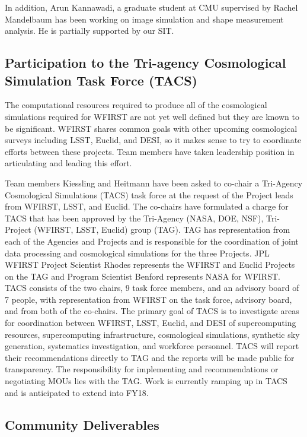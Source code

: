 In addition, Arun Kannawadi, a graduate student at CMU supervised by Rachel Mandelbaum has been working on image simulation and shape measurement analysis. He is partially supported by our SIT.

\subsection{Participation to the Tri-agency  Cosmological Simulation Task Force (TACS)}

The computational resources required to produce all of the cosmological simulations required for WFIRST are not yet well defined but they are known to be significant. WFIRST shares common goals with other upcoming cosmological surveys including LSST, Euclid, and DESI, so it makes sense to try to coordinate efforts between these projects. Team members have taken leadership position in articulating and leading this effort.

Team members Kiessling and Heitmann have been asked to co-chair a Tri-Agency Cosmological Simulations (TACS) task force at the request of the Project leads from WFIRST, LSST, and Euclid. The co-chairs have formulated a charge for TACS that has been approved by the Tri-Agency (NASA, DOE, NSF), Tri-Project (WFIRST, LSST, Euclid) group (TAG). TAG has representation from each of the Agencies and Projects and is responsible for the coordination of joint data processing and cosmological simulations for the three Projects. JPL WFIRST Project Scientist Rhodes represents the WFIRST and Euclid Projects on the TAG and Program Scientist Benford represents NASA for WFIRST. TACS consists of the two chairs, 9 task force members, and an advisory board of 7 people, with representation from WFIRST on the task force, advisory board, and from both of the co-chairs. The primary goal of TACS is to investigate areas for coordination between WFIRST, LSST, Euclid, and DESI of supercomputing resources, supercomputing infrastructure, cosmological simulations, synthetic sky generation, systematics investigation, and workforce personnel. TACS will report their recommendations directly to TAG and the reports will be made public for transparency. The responsibility for implementing and recommendations or negotiating MOUs lies with the TAG. Work is currently ramping up in TACS and is anticipated to extend into FY18.


\subsection{Community Deliverables}


